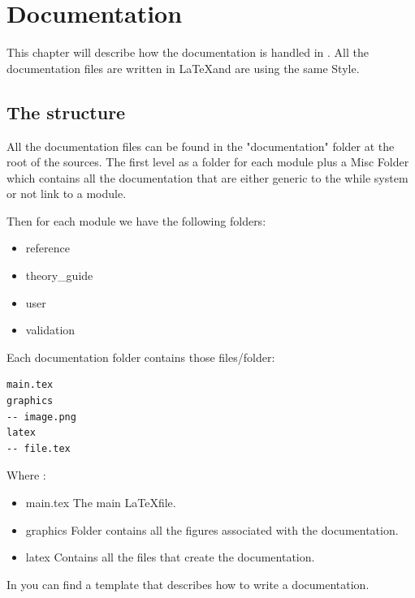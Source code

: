 \chapter{Documentation}

This chapter will describe how the documentation is handled in \telemacsystem.
All the documentation files are written in \LaTeX and are using the same Style.

\section{The structure}
All the documentation files can be found in the "documentation" folder at the
root of the \telemacsystem sources. The first level as a folder for each module
plus a Misc Folder which contains all the documentation that are either generic
to the while system or not link to a module.

Then for each module we have the following folders:
\begin{itemize}
\item reference
\item theory\_guide
\item user
\item validation
\end{itemize}

Each documentation folder contains those files/folder:
\begin{verbatim}
main.tex
graphics
-- image.png
latex
-- file.tex
\end{verbatim}

Where :
\begin{itemize}
\item main.tex The main \LaTeX file.
\item graphics Folder contains all the figures associated with the
  documentation.
\item latex Contains all the files that create the documentation.
\end{itemize}

In  you can find a template that describes how
to write a \telemacsystem documentation.

